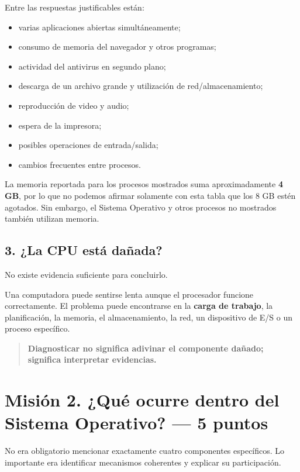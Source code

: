 \documentclass[
  spanish,
  letterpaper,
]{scrbook}
\providecommand{\tightlist}{%
  \setlength{\itemsep}{0pt}\setlength{\parskip}{0pt}}
\begin{document}
Entre las respuestas justificables están:

\begin{itemize}
\tightlist
\item
  varias aplicaciones abiertas simultáneamente;
\item
  consumo de memoria del navegador y otros programas;
\item
  actividad del antivirus en segundo plano;
\item
  descarga de un archivo grande y utilización de red/almacenamiento;
\item
  reproducción de video y audio;
\item
  espera de la impresora;
\item
  posibles operaciones de entrada/salida;
\item
  cambios frecuentes entre procesos.
\end{itemize}

La memoria reportada para los procesos mostrados suma aproximadamente
\textbf{4 GB}, por lo que no podemos afirmar solamente con esta tabla
que los 8 GB estén agotados. Sin embargo, el Sistema Operativo y otros
procesos no mostrados también utilizan memoria.

\section{3. ¿La CPU está dañada?}\label{la-cpu-estuxe1-dauxf1ada}

No existe evidencia suficiente para concluirlo.

Una computadora puede sentirse lenta aunque el procesador funcione
correctamente. El problema puede encontrarse en la \textbf{carga de
trabajo}, la planificación, la memoria, el almacenamiento, la red, un
dispositivo de E/S o un proceso específico.

\begin{quote}
\textbf{Diagnosticar no significa adivinar el componente dañado;
significa interpretar evidencias.}
\end{quote}


\chapter{Misión 2. ¿Qué ocurre dentro del Sistema Operativo? --- 5
puntos}\label{misiuxf3n-2.-quuxe9-ocurre-dentro-del-sistema-operativo-5-puntos-1}

No era obligatorio mencionar exactamente cuatro componentes específicos.
Lo importante era identificar mecanismos coherentes y explicar su
participación.
\end{document}
